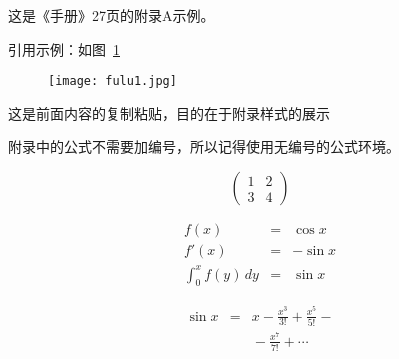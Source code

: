 \begin{appxchp}
这是《手册》27页的附录A示例。

引用示例：如图~\ref{appxfig:appxexampleA}

\begin{figure}[htbp]
\begin{center}
\texttt{[image: fulu1.jpg]}
\end{center}
\label{appxfig:appxexampleA}
\end{figure}

\end{appxchp}

\begin{appxchp}
这是前面内容的复制粘贴，目的在于附录样式的展示

\begin{figure}[htbp]
\centering
{}\hspace{4em}%
\hspace{4em}
\end{figure}

\begin{table}[htbp]
\begin{center}
\hspace{0.15\linewidth}
\end{center}
\end{table}

附录中的公式不需要加编号，所以记得使用无编号的公式环境。

\begin{equation*} 
\left(\begin{array}{c|c} 
1 & 2 \\ 
\hline 3 & 4 \end{array}\right) 
\end{equation*}   

\begin{eqnarray*}
f(x) & = & \cos x \\ 
f'(x) & = & -\sin x \\ 
\int_{0}^{x} f(y)\,dy & = & \sin x 
\end{eqnarray*} 

\begin{eqnarray*} 
\sin x & = & x -\frac{x^{3}}{3!} +\frac{x^{5}}{5!}-{} \nonumber\\ 
	& & {}-\frac{x^{7}}{7!}+{}\cdots 
\end{eqnarray*}

\end{appxchp}